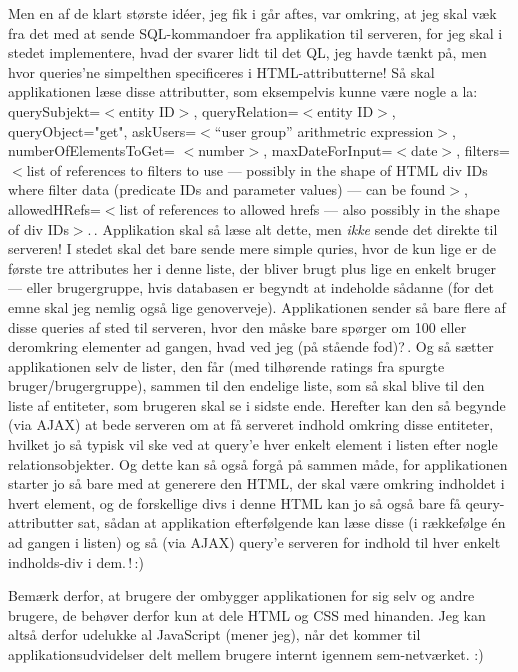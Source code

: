 \documentclass{report}
\begin{document}
Men en af de klart største idéer, jeg fik i går aftes, var omkring, at jeg skal væk fra det med at sende SQL-kommandoer fra applikation til serveren, for jeg skal i stedet implementere, hvad der svarer lidt til det QL, jeg havde tænkt på, men hvor queries'ne simpelthen specificeres i HTML-attributterne! Så skal applikationen læse disse attributter, som eksempelvis kunne være nogle a la: querySubjekt=$<$entity ID$>$, queryRelation=$<$entity ID$>$, queryObject="get", askUsers=$<$``user group'' arithmetric expression$>$, numberOfElementsToGet= $<$number$>$, maxDateForInput=$<$date$>$, filters=$<$list of references to filters to use --- possibly in the shape of HTML div IDs where filter data (predicate IDs and parameter values) --- can be found$>$, allowedHRefs=$<$list of references to allowed hrefs --- also possibly in the shape of div IDs$>$.\,. Applikation skal så læse alt dette, men \emph{ikke} sende det direkte til serveren! I stedet skal det bare sende mere simple quries, hvor de kun lige er de første tre attributes her i denne liste, der bliver brugt plus lige en enkelt bruger --- eller brugergruppe, hvis databasen er begyndt at indeholde sådanne (for det emne skal jeg nemlig også lige genoverveje). Applikationen sender så bare flere af disse queries af sted til serveren, hvor den måske bare spørger om 100 eller deromkring elementer ad gangen, hvad ved jeg (på stående fod)?\,. Og så sætter applikationen selv de lister, den får (med tilhørende ratings fra spurgte bruger/brugergruppe), sammen til den endelige liste, som så skal blive til den liste af entiteter, som brugeren skal se i sidste ende. Herefter kan den så begynde (via AJAX) at bede serveren om at få serveret indhold omkring disse entiteter, hvilket jo så typisk vil ske ved at query'e hver enkelt element i listen efter nogle relationsobjekter. Og dette kan så også forgå på sammen måde, for applikationen starter jo så bare med at generere den HTML, der skal være omkring indholdet i hvert element, og de forskellige divs i denne HTML kan jo så også bare få qeury-attributter sat, sådan at applikation efterfølgende kan læse disse (i rækkefølge én ad gangen i listen) og så (via AJAX) query'e serveren for indhold til hver enkelt indholds-div i dem.\,!\,:) 

Bemærk derfor, at brugere der ombygger applikationen for sig selv og andre brugere, de behøver derfor kun at dele HTML og CSS med hinanden. Jeg kan altså derfor udelukke al JavaScript (mener jeg), når det kommer til applikationsudvidelser delt mellem brugere internt igennem sem-netværket. :) 
\end{document}
